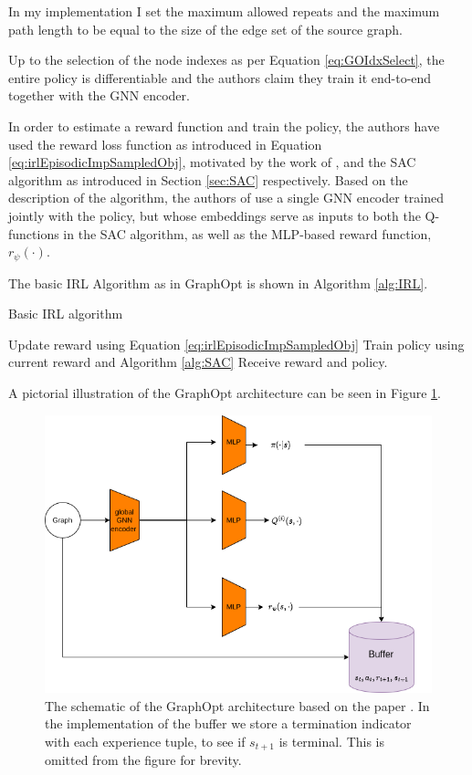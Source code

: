 \documentclass{report}
\numberwithin{equation}{section}
\numberwithin{figure}{section}
\numberwithin{table}{section}
\numberwithin{algorithm}{section}
\begin{document}
In my implementation I set the maximum allowed repeats 
and the maximum path length to be 
equal to the size of the edge set of the source graph. 

Up to the selection of the node 
indexes as per Equation \ref{eq:GOIdxSelect}, the entire policy 
is differentiable and the authors claim they train it end-to-end 
together with the GNN encoder.

In order to estimate a reward function and train the policy, 
the authors have used the reward loss function as introduced in 
Equation \ref{eq:irlEpisodicImpSampledObj}, motivated by the 
work of \cite{FinnGCL}, and the SAC algorithm \citep{SAC2} 
as introduced in Section \ref{sec:SAC} respectively. Based on 
the description of the algorithm, the authors of \cite{GraphOpt} 
use a single GNN encoder trained jointly with the policy, but 
whose embeddings serve as inputs to both the Q-functions in the 
SAC algorithm, as well as the MLP-based reward function, $r_\psi(\cdot)$.

The basic IRL Algorithm as in GraphOpt is shown in Algorithm \ref{alg:IRL}.

\begin{algorithm}
  \caption{Basic IRL algorithm}
  \label{alg:IRL}
  \begin{algorithmic}
      \State Update reward using Equation \ref{eq:irlEpisodicImpSampledObj}
      \State Train policy using current reward and Algorithm \ref{alg:SAC}
    \EndFor
    \State Receive reward and policy.
  \end{algorithmic}
\end{algorithm}

A pictorial illustration of the GraphOpt architecture can 
be seen in Figure \ref{fig:GraphOpt}.

\begin{figure}[H]
  \begin{center}
    \includegraphics[scale=0.5]{GO_architecture.png}
    \caption{\label{fig:GraphOpt} The schematic of the GraphOpt 
    architecture based on the paper \cite{GraphOpt}. 
    In the implementation of the buffer 
    we store a termination indicator with 
    each experience tuple, to see if $s_{t+1}$ is terminal. 
    This is omitted from the figure for brevity.}
  \end{center}
\end{figure}
\end{document}
